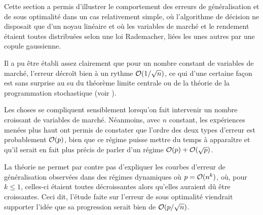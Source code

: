 Cette section a permis d'illustrer le comportement des erreurs de généralisation et de
sous optimalité dans un cas relativement simple, où l'algorithme de décision ne disposait
que d'un noyau linéaire et où les variables de marché et le rendement étaient toutes
distribuées selon une loi Rademacher, liées les unes autres par une copule gaussienne.

Il a pu être établi assez clairement que pour un nombre constant de variables de marché,
l'erreur décroît bien à un rythme $\mathcal O(1/\sqrt{n})$, ce qui d'une certaine façon est
sans surprise au su du théorème limite centrale ou de la théorie de la programmation
stochastique (voir \cite{shapiro2009lectures}).

Les choses se compliquent sensiblement lorsqu'on fait intervenir un nombre croissant de
variables de marché. Néanmoins, avec $n$ constant, les expériences menées plus haut ont
permis de constater que l'ordre des deux types d'erreur est probablement $\mathcal O(p)$, bien
que ce régime puisse mettre du temps à apparaître et qu'il serait en fait plus précis de
parler d'un régime $\mathcal O(p) + \mathcal O(\sqrt{p})$.

La théorie ne permet par contre pas d'expliquer les courbes d'erreur de généralisation
observées dans des régimes dynamiques où $p=\mathcal O(n^k)$, où, pour $k\leq1$, celles-ci étaient
toutes décroissantes alors qu'elles auraient dû être croissantes. Ceci dit, l'étude faite
sur l'erreur de sous optimalité viendrait supporter l'idée que sa progression serait bien
de $\mathcal O(p/\sqrt{n})$.




